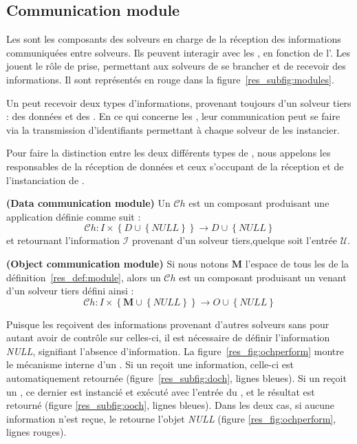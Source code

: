 \subsection{Communication module}

Les \opchs{} sont  les composants des solveurs en charge  de la réception des informations communiquées entre solveurs. Ils  peuvent interagir
avec les  \oms, en fonction de l'\as. Les \opchs{} jouent le rôle de prise, permettant aux solveurs de  se  brancher et  de recevoir  des informations. Il sont représentés en rouge dans la figure~\ref{res_subfig:modules}.

Un \opch{} peut recevoir deux types d'informations, provenant toujours d'un solveur tiers : des données et des \oms. En ce qui concerne les \oms, leur communication peut se faire via la  transmission d'identifiants permettant à chaque solveur de les instancier.

Pour faire la distinction entre  les deux différents types  de \opchs, nous appelons \INTROdopch{} les \opchs{} responsables de la réception de données  et \INTROoopch{} ceux s'occupant de la réception et de l'instanciation de \oms.

\begin{lemma} \label{res_def:dopench} \textbf{(Data communication module)}
Un \dopch{} $\mathcal{C}h$ est un composant produisant une application définie comme suit : 
\begin{equation}
\mathcal{C}h: I\times\left\{D\cup\left\{NULL\right\}\right\} \rightarrow D \cup \left\{NULL\right\}
\end{equation}
et retournant l'information  $\mathcal{I}$ provenant d'un solveur tiers,quelque soit l'entrée $\mathcal{U}$.
\end{lemma}

\begin{lemma}\label{res_def:oopench} \textbf{(Object communication module)} 
Si nous notons $\mathbf{M}$ l'espace  de  tous  les \oms{} de la définition~\ref{res_def:module}, alors un \oopch{} $\mathcal{C}h$ est  un composant produisant un \om{}  venant d'un solveur tiers défini ainsi :
\begin{equation}
\mathcal{C}h:I\times\left\{\mathbf{M}\cup\left\{NULL\right\}\right\} \rightarrow O\cup\left\{NULL\right\}
\end{equation}
\end{lemma}

Puisque les \opchs{} reçoivent des informations provenant  d'autres solveurs sans pour autant avoir de contrôle sur celles-ci, il est  nécessaire  de  définir   l'information  {\it  NULL}, signifiant l'absence  d'information. La  figure~\ref{res_fig:ochperform}  montre  le mécanisme interne d'un  \opch{}. Si un \dopch{} reçoit une information,  celle-ci est  automatiquement retournée (figure~\ref{res_subfig:doch}, lignes bleues). Si un \oopch{} reçoit un \om{}, ce dernier est instancié et exécuté avec l'entrée du \opch, et le résultat est retourné (figure \ref{res_subfig:ooch}, lignes bleues). Dans les deux  cas, si aucune information n'est reçue, le \opch{} retourne l'objet  {\it NULL}  (figure \ref{res_fig:ochperform}, lignes rouges).

